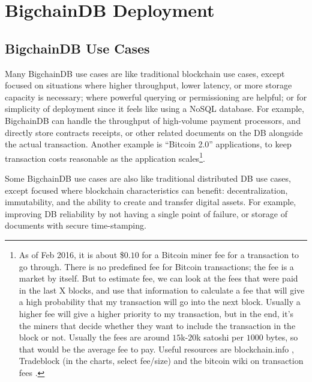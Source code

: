 \section{BigchainDB Deployment}\label{sec:deployment}

\subsection{BigchainDB Use Cases}

Many BigchainDB use cases are like traditional blockchain use cases, except focused on situations where higher throughput, lower latency, or more storage capacity is necessary; where powerful querying or permissioning are helpful; or for simplicity of deployment since it feels like using a NoSQL database.
For example, BigchainDB can handle the throughput of high-volume payment processors, and directly store contracts receipts, or other related documents on the DB alongside the actual transaction.
Another example is “Bitcoin 2.0” applications, to keep transaction costs reasonable as the application scales\footnote{
As of Feb 2016, it is about \$$0.10$ for a Bitcoin miner fee for a transaction to go through.
There is no predefined fee for Bitcoin transactions; the fee is a market by itself.
But to estimate fee, we can look at the fees that were paid in the last X blocks, and use that information to calculate a fee that will give a high probability that my transaction will go into the next block.
Usually a higher fee will give a higher priority to my transaction, but in the end, it's the miners that decide whether they want to include the transaction in the block or not.
Usually the fees are around $15$k-$20$k satoshi per $1000$ bytes, so that would be the average fee to pay.
Useful resources are blockchain.info \cite{blockchaininfo2015transaction_fees}, Tradeblock \cite{tradeblock} (in the charts, select fee/size) and the bitcoin wiki on transaction fees \cite{bitcoin2015fees}.
}.

Some BigchainDB use cases are also like traditional distributed DB use cases, except focused where blockchain characteristics can benefit: decentralization, immutability, and the ability to create and transfer digital assets. For example, improving DB reliability by not having a single point of failure, or storage of documents with secure time-stamping.


